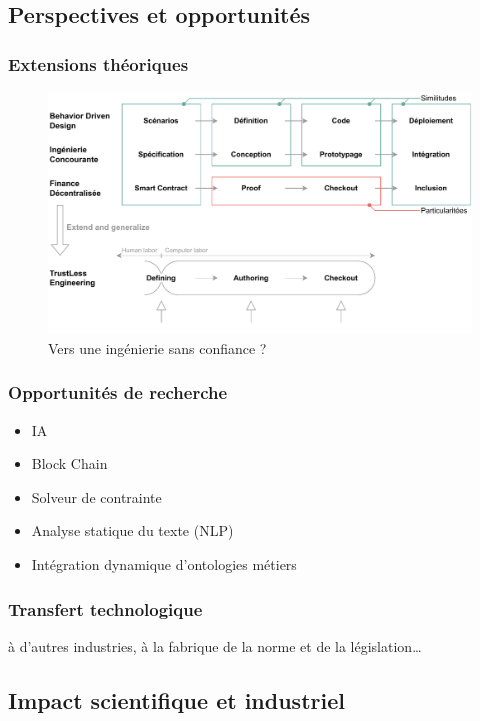 \documentclass[a4paper,12pt]{article}
\begin{document}
\subsection{Perspectives et opportunités}
\label{sec:org90a87ce}
\subsubsection{Extensions théoriques}
\label{sec:orgfd36fe0}

\begin{figure}[htbp]
\centering
\includegraphics[width=.9\linewidth]{./svg/long-term-goal.pdf}
\caption{\label{fig:orgb49374e}Vers une ingénierie sans confiance ?}
\end{figure}
\subsubsection{Opportunités de recherche}
\label{sec:orgacf2593}
\begin{itemize}
\item IA
\item Block Chain
\item Solveur de contrainte
\item Analyse statique du texte (NLP)
\item Intégration dynamique d'ontologies métiers
\end{itemize}
\subsubsection{Transfert technologique}
\label{sec:orgc9545a9}
à d'autres industries,
à la fabrique de la norme et de la législation\ldots{}
\subsection{Impact scientifique et industriel}
\label{sec:org056b238}
\end{document}
